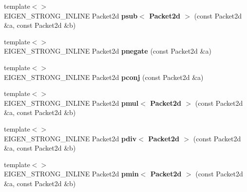 \begin{DoxyCompactItemize}
\item 
\mbox{\label{namespace_eigen_1_1internal_ae29e411b8fe47ba97cda746ebf5745d9}} 
{\footnotesize template$<$$>$ }\\E\+I\+G\+E\+N\+\_\+\+S\+T\+R\+O\+N\+G\+\_\+\+I\+N\+L\+I\+NE Packet2d {\bfseries psub$<$ Packet2d $>$} (const Packet2d \&a, const Packet2d \&b)
\item 
\mbox{\label{namespace_eigen_1_1internal_a422cda909d8bb0c3d0e871a0c94ae939}} 
{\footnotesize template$<$$>$ }\\E\+I\+G\+E\+N\+\_\+\+S\+T\+R\+O\+N\+G\+\_\+\+I\+N\+L\+I\+NE Packet2d {\bfseries pnegate} (const Packet2d \&a)
\item 
\mbox{\label{namespace_eigen_1_1internal_adee7703d8adb8884bef0a76838f24ffe}} 
{\footnotesize template$<$$>$ }\\E\+I\+G\+E\+N\+\_\+\+S\+T\+R\+O\+N\+G\+\_\+\+I\+N\+L\+I\+NE Packet2d {\bfseries pconj} (const Packet2d \&a)
\item 
\mbox{\label{namespace_eigen_1_1internal_a7ddaaf72ad6b225759980160fdb93eb1}} 
{\footnotesize template$<$$>$ }\\E\+I\+G\+E\+N\+\_\+\+S\+T\+R\+O\+N\+G\+\_\+\+I\+N\+L\+I\+NE Packet2d {\bfseries pmul$<$ Packet2d $>$} (const Packet2d \&a, const Packet2d \&b)
\item 
\mbox{\label{namespace_eigen_1_1internal_a8d9b6dd22a9568380b3b54ece5eac0f0}} 
{\footnotesize template$<$$>$ }\\E\+I\+G\+E\+N\+\_\+\+S\+T\+R\+O\+N\+G\+\_\+\+I\+N\+L\+I\+NE Packet2d {\bfseries pdiv$<$ Packet2d $>$} (const Packet2d \&a, const Packet2d \&b)
\item 
\mbox{\label{namespace_eigen_1_1internal_acb800a8a7597c7cfe1955fcb2fe87e57}} 
{\footnotesize template$<$$>$ }\\E\+I\+G\+E\+N\+\_\+\+S\+T\+R\+O\+N\+G\+\_\+\+I\+N\+L\+I\+NE Packet2d {\bfseries pmin$<$ Packet2d $>$} (const Packet2d \&a, const Packet2d \&b)
\item 
\mbox{\label{namespace_eigen_1_1internal_aeab59aec7b70a1f67d9f060b55903ceb}} 

\end{DoxyCompactItemize}
